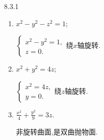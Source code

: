 \begin{exercise}{8.3.1}
\begin{enumerate}
            \item $x^2-y^2-z^2=1$;
        \begin{solution}
        $\begin{cases}
            x^2-y^2=1,\\
            z=0.
        \end{cases}$绕$x$轴旋转.
        \end{solution}

            \item $x^2+y^2=4z$;
        \begin{solution}
        $\begin{cases}
            x^2=4z,\\
            y=0.
        \end{cases}$绕$z$轴旋转.
        \end{solution}

            \item $\frac{x^2}{4}+\frac{y^2}{9}=3z$.
        \begin{solution}
        非旋转曲面,是双曲抛物面.
        \end{solution}

        \end{enumerate}
\end{exercise}

